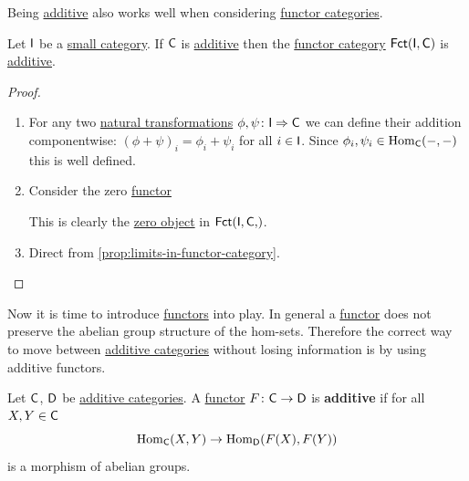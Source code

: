 \documentclass[../../main]{subfiles}
\begin{document}
Being \hyperref[def:additive-category]{additive} also works well when considering \hyperref[def:functor-category]{functor categories}.
\begin{lemma}\label{lemma:functor-category-is-additive}
  Let \(\mathsf{I}\) be a \hyperref[def:small-category]{small category}.
  If \(\mathsf{C}\) is \hyperref[def:additive-category]{additive} then the \hyperref[def:functor-category]{functor category} \(\mathsf{Fct}(\mathsf{I}, \mathsf{C})\) is \hyperref[def:additive-category]{additive}.
\end{lemma}
\begin{proof}~
  \begin{enumerate}
    \item[\ref{axiom:additive-hom}] For any two \hyperref[def:natural-transformation]{natural transformations} \(\phi, \psi\colon \mathsf{I} \Rightarrow \mathsf{C}\) we can define their addition componentwise: \((\phi + \psi)_{i} = \phi_{i} + \psi_{i}\) for all \(i \in \mathsf{I}\).
          Since \(\phi_{i}, \psi_{i} \in \operatorname{Hom}_{\mathsf{C}}(-, -)\) this is well defined.
    \item[\ref{axiom:additive-zero}] Consider the zero \hyperref[def:functor]{functor}
          \begin{center}
          \end{center}
          This is clearly the \hyperref[def:zero-object]{zero object} in \(\Fct{\category{I}, \category{C}}\).
    \item[\ref{axiom:additive-coproducts}, \ref{axiom:additive-products}] Direct from \autoref{prop:limits-in-functor-category}. \qedhere
  \end{enumerate}
\end{proof}

Now it is time to introduce \hyperref[def:functor]{functors} into play.
In general a \hyperref[def:functor]{functor} does not preserve the abelian group structure of the hom-sets.
Therefore the correct way to move between \hyperref[def:additive-category]{additive categories} without losing information is by using additive functors.
\begin{definition}\label{def:additive-functor}
  Let \(\mathsf{C}\), \(\mathsf{D}\) be \hyperref[def:additive-category]{additive categories}.
  A \hyperref[def:functor]{functor} \(F\colon \mathsf{C} \to \mathsf{D}\) is \textbf{additive} if for all \(X, Y \in \mathsf{C}\)
  \begin{equation*}
    \operatorname{Hom}_{\mathsf{C}}(X, Y) \to \operatorname{Hom}_{\mathsf{D}}(F(X), F(Y))
  \end{equation*}
  is a morphism of abelian groups.
\end{definition}
\end{document}
